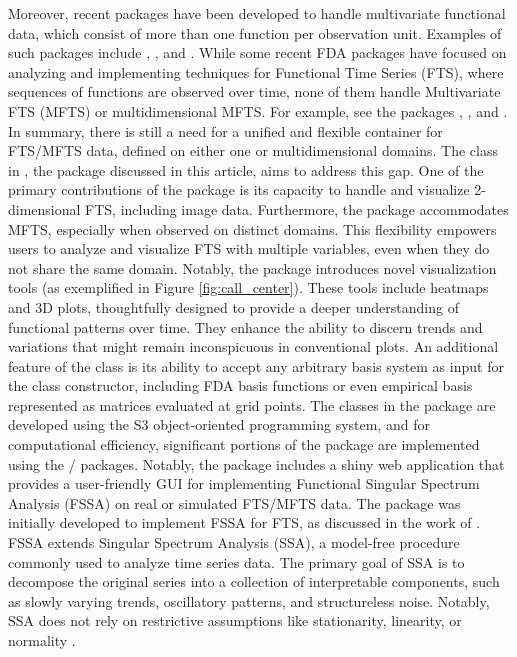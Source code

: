 Moreover, recent packages have been developed to handle multivariate functional data, which consist of more than one function per observation unit. Examples of such packages include , , and .
While some recent FDA packages have focused on analyzing and implementing techniques for Functional Time Series (FTS), where sequences of functions are observed over time, none of them handle Multivariate FTS (MFTS) or multidimensional MFTS. For example, see the packages , , and . In summary, there is still a need for a unified and flexible container for FTS/MFTS data, defined on either one or multidimensional domains. The  class in  \citep{rfssapackage}, the package discussed in this article, aims to address this gap. One of the primary contributions of the package is its capacity to handle and visualize 2-dimensional FTS, including image data. Furthermore, the package accommodates MFTS, especially when observed on distinct domains. This flexibility empowers users to analyze and visualize FTS with multiple variables, even when they do not share the same domain. Notably, the  package introduces novel visualization tools (as exemplified in Figure \ref{fig:call_center}). These tools include heatmaps and 3D plots, thoughtfully designed to provide a deeper understanding of functional patterns over time. They enhance the ability to discern trends and variations that might remain inconspicuous in conventional plots. An additional feature of the  class is its ability to accept any arbitrary basis system as input for the class constructor, including FDA basis functions or even empirical basis represented as matrices evaluated at grid points. The classes in the  package are developed using the S3 object-oriented programming system, and for computational efficiency, significant portions of the package are implemented using the / packages. Notably, the package includes a shiny web application that provides a user-friendly GUI for implementing Functional Singular Spectrum Analysis (FSSA) on real or simulated FTS/MFTS data.
The  package was initially developed to implement FSSA for FTS, as discussed in the work of \cite{haghbin2021}. FSSA extends Singular Spectrum Analysis (SSA), a model-free procedure commonly used to analyze time series data. The primary goal of SSA is to decompose the original series into a collection of interpretable components, such as slowly varying trends, oscillatory patterns, and structureless noise. Notably, SSA does not rely on restrictive assumptions like stationarity, linearity, or normality \citep{golyandina2013}.
